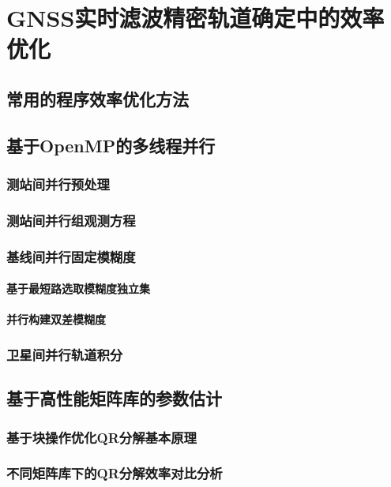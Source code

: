 
\chapter{GNSS实时滤波精密轨道确定中的效率优化}

\section{常用的程序效率优化方法}

\section{基于OpenMP的多线程并行}

\subsection{测站间并行预处理}

\subsection{测站间并行组观测方程}

\subsection{基线间并行固定模糊度}

\subsubsection{基于最短路选取模糊度独立集}

\subsubsection{并行构建双差模糊度}

\subsection{卫星间并行轨道积分}

\section{基于高性能矩阵库的参数估计}

\subsection{基于块操作优化QR分解基本原理}

\subsection{不同矩阵库下的QR分解效率对比分析}
